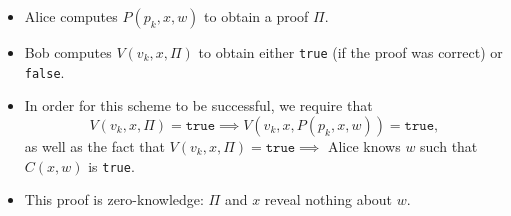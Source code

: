 \documentclass{article}
\begin{document}
\begin{itemize}
\begin{itemize}
	\item Alice computes $P(p_k, x, w)$ to obtain a proof $\Pi$.
	\item Bob computes $V(v_k, x, \Pi)$ to obtain either \texttt{true} (if the proof was correct) or \texttt{false}.
	\item In order for this scheme to be successful, we require that
		\begin{equation}
		V(v_k, x, \Pi) = \texttt{true} \implies V(v_k, x, P(p_k, x, w)) = \texttt{true},
		\end{equation}
		as well as the fact that $V(v_k, x, \Pi) = \texttt{true} \implies$ Alice knows $w$ such that $C(x, w)$ is \texttt{true}.
	\item This proof is zero-knowledge: $\Pi$ and $x$ reveal nothing about $w$.
	\end{itemize}
\end{itemize}


\end{document}
